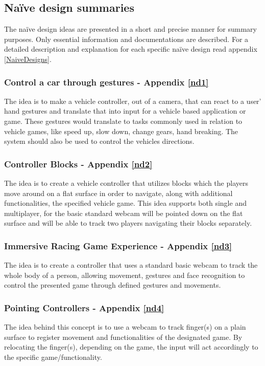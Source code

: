 \subsection{Naïve design summaries}
The naïve design ideas are presented in a short and precise manner for summary purposes. Only essential information and documentations are described. For a detailed description and explanation for each specific naïve design read appendix \ref{NaiveDesigns}. 

\subsubsection{Control a car through gestures - Appendix \ref{nd1}}
 The idea is to make a vehicle controller, out of a camera, that can react to a user’ hand gestures and translate that into input for a vehicle based application or game. These gestures would translate to tasks commonly used in relation to vehicle games, like speed up, slow down, change gears, hand breaking. The system should also be used to control the vehicles directions.

\subsubsection{Controller Blocks - Appendix \ref{nd2}}
The idea is to create a vehicle controller that utilizes blocks which the players move around on a flat surface in order to navigate, along with additional functionalities, the specified vehicle game. This idea supports both single and multiplayer, for the basic standard webcam will be pointed down on the flat surface and will be able to track two players navigating their blocks separately.

\subsubsection{Immersive Racing Game Experience - Appendix \ref{nd3}}
The idea is to create a controller that uses a standard basic webcam to track the whole body of a person, allowing movement, gestures and face recognition to control the presented game through defined gestures and movements.

\subsubsection{Pointing Controllers - Appendix \ref{nd4}}
The idea behind this concept is to use a webcam to track finger(s) on a plain surface to register movement and functionalities of the designated game. By relocating the finger(s), depending on the game, the input will act accordingly to the specific game/functionality.


